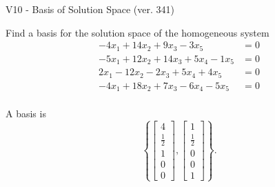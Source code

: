 \begin{exercise}
  \begin{exerciseTitle}V10 - Basis of Solution Space (ver. 341)\end{exerciseTitle}
  \begin{exerciseStatement}
    Find a basis for the solution space of the homogeneous system 
\begin{align*}
 -4 x_ 1 + 14 x_ 2 + 9 x_ 3 -3 x_ 5 &= 0  \\ 
  -5 x_ 1 + 12 x_ 2 + 14 x_ 3 + 5 x_ 4 -1 x_ 5 &= 0  \\ 
  2 x_ 1 -12 x_ 2 -2 x_ 3 + 5 x_ 4 + 4 x_ 5 &= 0  \\ 
  -4 x_ 1 + 18 x_ 2 + 7 x_ 3 -6 x_ 4 -5 x_ 5 &= 0  \\ 
 \end{align*}


 
  \end{exerciseStatement}

  \begin{exerciseAnswer}
   A basis is   
\[\left\{\left[\begin{array}{c}
4 \\
\frac{1}{2} \\
1 \\
0 \\
0
\end{array}\right] , \left[\begin{array}{c}
1 \\
\frac{1}{2} \\
0 \\
0 \\
1
\end{array}\right]\right\}.\]

  


  \end{exerciseAnswer}
\end{exercise}